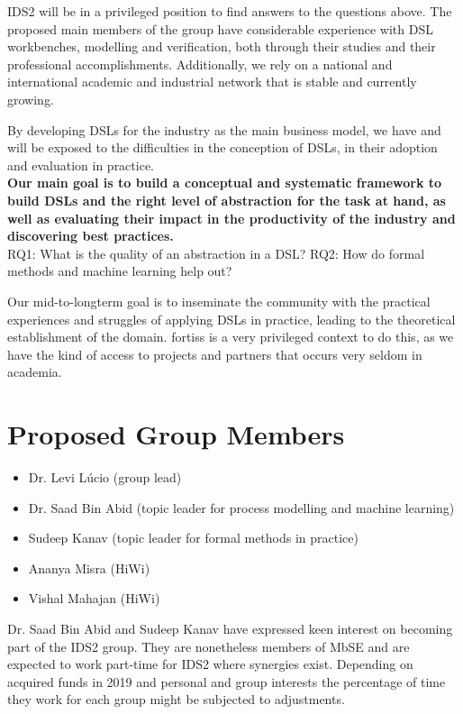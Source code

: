 \documentclass{article}
\begin{document}
IDS2 will be in a privileged position to find answers to the questions
above. The proposed main members of the group have considerable experience with
DSL workbenches, modelling and verification, both through their studies and their
professional accomplishments. Additionally, we rely on a national and
international academic and industrial network that is stable and currently
growing.

By developing DSLs for the industry as the main business model, we have and will
be exposed to the difficulties in the conception of DSLs, in their adoption and
evaluation in practice.\\

\textbf{Our main goal is to build a conceptual and systematic framework to build
DSLs and the right level of abstraction for the task at hand, as well as
evaluating their impact in the productivity of the industry and
discovering best practices.}\\

RQ1: What is the quality of an abstraction in a DSL?
RQ2: How do formal methods and machine learning help out?

Our mid-to-longterm goal is to inseminate the community with the practical
experiences and struggles of applying DSLs in practice, leading to the
theoretical establishment of the domain. fortiss is a very privileged context to
do this, as we have the kind of access to projects and partners that occurs very
seldom in academia. 

\section{Proposed Group Members}

\begin{itemize}
  \item Dr. Levi L\'ucio (group lead)
  \item Dr. Saad Bin Abid (topic leader for process modelling and machine
  learning)
  \item Sudeep Kanav (topic leader for formal methods in practice)
  \item Ananya Misra (HiWi)
  \item Vishal Mahajan (HiWi)
\end{itemize}

Dr. Saad Bin Abid and Sudeep Kanav have expressed keen interest on becoming part
of the IDS2 group. They are nonetheless members of MbSE and are
expected to work part-time for IDS2 where synergies exist. Depending on acquired
funds in 2019 and personal and group interests the percentage of time they work
for each group might be subjected to adjustments.
\end{document}
